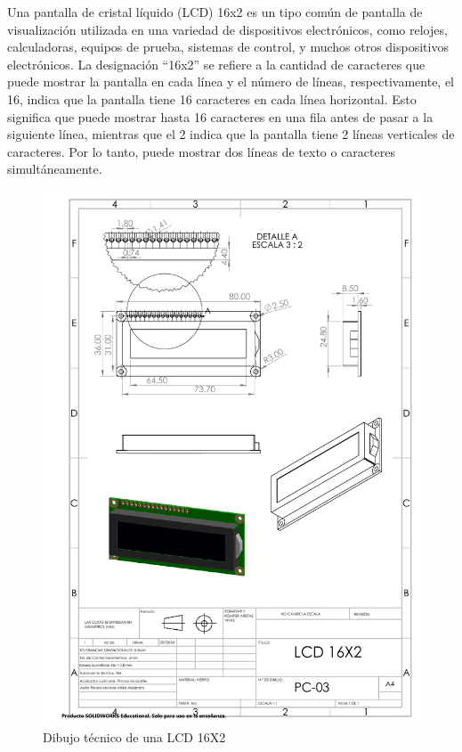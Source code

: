     Una pantalla de cristal líquido (LCD) 16x2 es un tipo común de pantalla de visualización utilizada en una variedad de dispositivos electrónicos, como relojes, calculadoras, equipos de prueba, sistemas de control, y muchos otros dispositivos electrónicos. La designación “16x2” se refiere a la cantidad de caracteres que puede mostrar la pantalla en cada línea y el número de líneas, respectivamente, el 16, indica que la pantalla tiene 16 caracteres en cada línea horizontal. Esto significa que puede mostrar hasta 16 caracteres en una fila antes de pasar a la siguiente línea, mientras que el 2 indica que la pantalla tiene 2 líneas verticales de caracteres. Por lo tanto, puede mostrar dos líneas de texto o caracteres simultáneamente.
    \begin{figure}[H]
        \centering
        \includegraphics[trim = {22mm 180mm 25mm 15mm},clip,scale=0.4]{22/Img/lcdDibujo.PDF}
        \caption{Dibujo técnico de una LCD 16X2}
        \label{fig:lcd}
    \end{figure}
    
